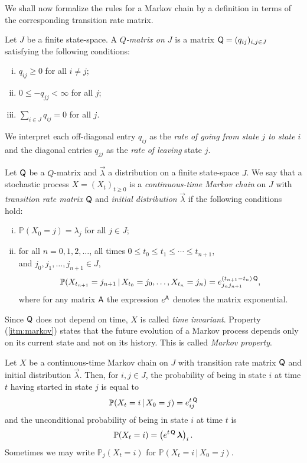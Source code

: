 \documentclass[smallextended]{svjour3}
\renewcommand{\P}{\mathbb{P}}
\newcommand{\suml}{\sum\limits}
\begin{document}
We shall now formalize the rules for a Markov chain by a definition in terms of the corresponding transition rate matrix.
\begin{definition}\label{def:Qmatrix}
Let $J$ be a finite state-space. A \emph{$Q$-matrix on $J$} is a matrix $\mathsf{Q}=(q_{ij})_{i,j\in J}$ satisfying the following conditions:
\begin{enumerate}[(i)]
    \item $q_{ij} \geq 0$ for all $i\neq j$;\label{prop:Qmatrix_offdiag}
    \item $0\leq -q_{jj}<\infty$ for all $j$;\label{prop:Qmatrix_diag}
    \item $\suml_{i\in J} q_{ij} = 0$ for all $j$.\label{prop:Qmatrix_column_sum}
\end{enumerate}
\end{definition}
We interpret each off-diagonal entry $q_{ij}$ as the \emph{rate of going from state $j$ to state $i$} and the diagonal entries $q_{jj}$ as the \emph{rate of leaving} state $j$.

\begin{definition}\label{def:CTMC}
    Let $\mathsf{Q}$ be a $Q$-matrix and $\vec{\lambda}$ a distribution on a finite state-space $J$.
    We say that a stochastic process $X=(X_t)_{t\geq0}$ is a \emph{continuous-time Markov chain} on $J$ with \emph{transition rate matrix} $\mathsf{Q}$ and \emph{initial distribution} $\vec{\lambda}$ if the following conditions hold:
    \begin{enumerate}[(i)]
        \item $\P(X_0=j) = \lambda_j$ for all $j\in J$;
        \item\label{itm:markov} for all $n=0,1,2,\ldots$, all times $0\leq t_0\leq t_1\leq \cdots\leq t_{n+1}$,\\ and $j_0,j_1,\ldots,j_{n+1}\in J$,
            \[
                \P(X_{t_{n+1}} = j_{n+1}\,|\,X_{t_0}=j_0,\ldots,X_{t_n}=j_n)=e^{(t_{n+1}-t_n)\,\tens{Q}}_{j_n j_{n+1}},
            \]
            where for any matrix $\mathsf{A}$ the expression $e^{\mathsf{A}}$ denotes the matrix exponential.
    \end{enumerate}
\end{definition}
Since $\mathsf{Q}$ does not depend on time, $X$ is called \emph{time invariant}.
Property (\ref{itm:markov}) states that the future evolution of a Markov process depends only on its current state and not on its history.
This is called \emph{Markov property}.

Let $X$ be a continuous-time Markov chain on $J$ with transition rate matrix $\mathsf{Q}$ and initial distribution $\vec{\lambda}$.
Then, for $i,j\in J$, the probability of being in state $i$ at time $t$ having started in state $j$ is equal to
\[
    \P(X_t=i\,|\,X_0=j) = e^{t\,\tens{Q}}_{ij}
\]
and the unconditional probability of being in state $i$ at time $t$ is
\[
    \P(X_t=i)=\left(e^{t\,\tens{Q}}\,\vec{\lambda}\right)_i.
\]
Sometimes we may write $\P_j(X_t=i)$ for $\P(X_t=i\,|\,X_0=j)$.
\end{document}
